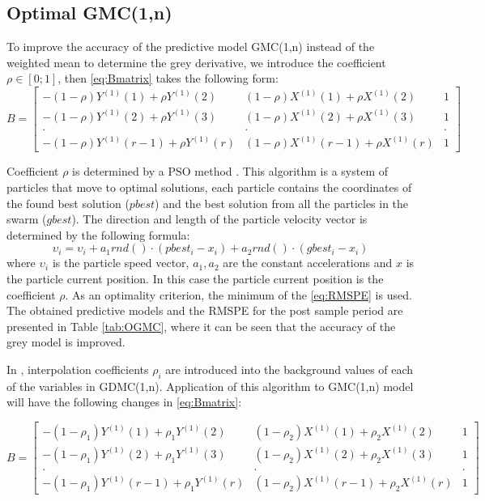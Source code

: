 \documentclass[AMS,STIX2COL]{WileyNJD-v2}
\begin{document}
\subsection{Optimal GMC(1,n)}
To improve the accuracy of the predictive model GMC(1,n) instead of the weighted mean to determine the grey derivative, we introduce the coefficient $\rho \in [0;1]$, then \eqref{eq:Bmatrix} takes the following  form:
\begin{equation}
B = \begin{bmatrix}
-(1-\rho)Y^{(1)}(1)+\rho Y^{(1)}(2) & (1-\rho)X^{(1)}(1)+\rho X^{(1)}(2) & 1 \\ 
-(1-\rho)Y^{(1)}(2)+\rho Y^{(1)}(3) & (1-\rho)X^{(1)}(2)+\rho X^{(1)}(3) & 1 \\
. & . & .\\
-(1-\rho)Y^{(1)}(r-1)+\rho Y^{(1)}(r) &(1-\rho)X^{(1)}(r-1)+\rho X^{(1)}(r) & 1
\end{bmatrix}
\end{equation}

Coefficient $\rho$ is determined by a PSO method \cite{Kennedy1995}. This algorithm is a system of particles that move to optimal solutions, each particle contains the coordinates of the found best solution ($pbest$) and the best solution from all the particles in the swarm ($gbest$). The direction and length of the particle velocity vector is determined by the following formula:
\begin{equation} \label{PSO}
\upsilon_i = \upsilon_i + a_1rnd()\cdot (pbest_i-x_i)+a_2rnd()\cdot(gbest_i-x_i)
\end{equation}
where $\upsilon_i$  is the particle speed vector, $a_1, a_2$   are the constant accelerations and $x$  is the particle current position. In this case the particle current position is the coefficient $\rho$. As an optimality criterion, the minimum of the \eqref{eq:RMSPE} is used. The obtained predictive models and the RMSPE for the post sample period are presented in Table \ref{tab:OGMC}, where it can be seen that the accuracy of the grey model is improved.

In \cite{Wang2014}, interpolation coefficients $\rho_i$ are introduced into the background values of each of the variables in GDMC(1,n). Application of this algorithm to GMC(1,n) model will have the following changes in \eqref{eq:Bmatrix}:

\begin{equation}
B = \begin{bmatrix}
-(1-\rho_1)Y^{(1)}(1)+\rho_1 Y^{(1)}(2) & (1-\rho_2)X^{(1)}(1)+\rho_2 X^{(1)}(2) & 1 \\ 
-(1-\rho_1)Y^{(1)}(2)+\rho_1 Y^{(1)}(3) & (1-\rho_2)X^{(1)}(2)+\rho_2 X^{(1)}(3) & 1 \\
. & . & .\\
-(1-\rho_1)Y^{(1)}(r-1)+\rho_1 Y^{(1)}(r) &(1-\rho_2)X^{(1)}(r-1)+\rho_2 X^{(1)}(r) & 1
\end{bmatrix}
\end{equation}
\end{document}
